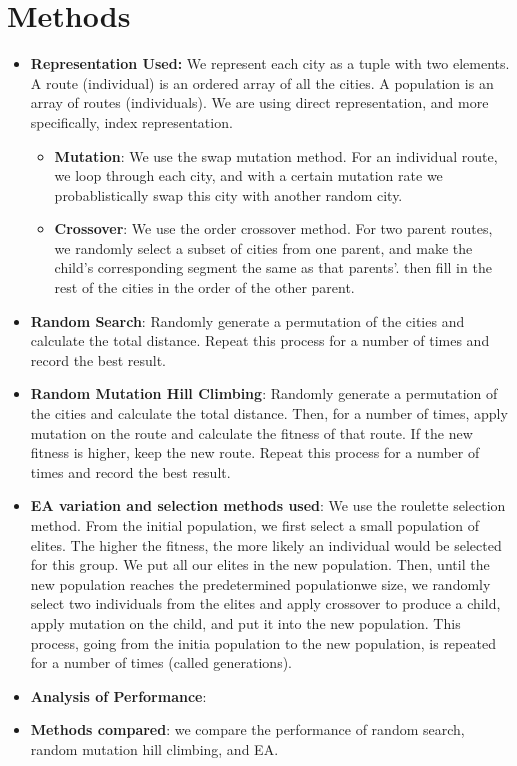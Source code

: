 \documentclass[twoside,11pt]{homework}
\begin{document}
\section*{Methods}
\begin{itemize}
    \item \textbf{Representation Used:} We represent each city as a tuple with two elements. 
    A route (individual) is an ordered array of all the cities. A population is an array of routes (individuals).
    We are using direct representation, and more specifically, index representation.
    \begin{itemize}
        \item \textbf{Mutation}: We use the swap mutation method. For an individual route, we loop through each city, and with a certain mutation rate
        we probablistically swap this city with another random city. 
        \item \textbf{Crossover}: We use the order crossover method. For two parent routes, we randomly select a subset of cities from one parent, and make the child's corresponding segment the same as that parents'.
        then fill in the rest of the cities in the order of the other parent.
    \end{itemize}
    \item \textbf{Random Search}: Randomly generate a permutation of the cities and calculate the total distance. Repeat this process for a number of times and record the best result.
    \item \textbf{Random Mutation Hill Climbing}: Randomly generate a permutation of the cities and calculate the total distance. Then, for a number of times, apply mutation on the route and calculate the fitness of that route. 
    If the new fitness is higher, keep the new route. Repeat this process for a number of times and record the best result.
    \item \textbf{EA variation and selection methods used}: We use the roulette selection method. From the initial population, we first select a small population of elites. The higher the fitness, the more likely an individual would
    be selected for this group. We put all our elites in the new population. Then, until the new population reaches the predetermined populationwe size, we randomly select two individuals from the elites and apply crossover to produce a child,
    apply mutation on the child, and put it into the new population. This process, going from the initia population to the new population, is repeated for a number of times (called generations).
    \item \textbf{Analysis of Performance}:
    \item \textbf{Methods compared}: we compare the performance of random search, random mutation hill climbing, and EA.
\end {itemize}
\end{document}
